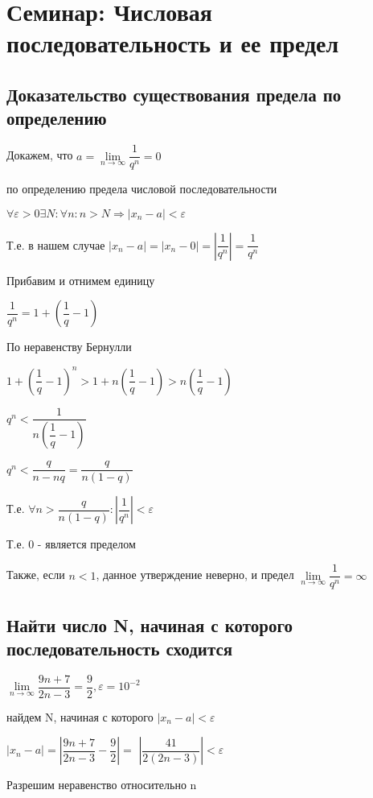 \section{Семинар: Числовая последовательность и ее предел}

\subsection{Доказательство существования предела по определению}

Докажем, что $ a = \lim\limits_{n \to \infty} \dfrac{1}{q^{n}} = 0$

по определению предела числовой последовательности

$\forall \varepsilon > 0 \exists N: \forall n: n > N \Rightarrow |x_{n} - a| < \varepsilon$

Т.е. в нашем случае $  |x_{n} - a| = |x_{n} - 0| = | \dfrac{1}{q^{n}} | = \dfrac{1}{q^{n}} $

Прибавим и отнимем единицу 

$ \dfrac{1}{q^{n}} = 1 + \left( \dfrac{1}{q} - 1 \right)  $

По неравенству Бернулли

$ 1 + ( \dfrac{1}{q} - 1 )^{n} > 1 + n ( \dfrac{1}{q} - 1 ) > n ( \dfrac{1}{q} - 1 ) $

$ q^{n} <  \dfrac{1}{n ( \dfrac{1}{q} - 1 )}  $

$ q^{n} <  \dfrac{q}{n - nq} = \dfrac{q}{n(1 - q)} $

Т.е. $ \forall n > \dfrac{q}{n(1 - q)} : | \dfrac{1}{q^{n}} | < \varepsilon $

Т.е. 0 - является пределом

Также, если $ n < 1 $, данное утверждение неверно, и предел 
$ \lim\limits_{n \to \infty} \dfrac{1}{q^{n}} = \infty $

\subsection{Найти число N, начиная с которого последовательность сходится}

$ \lim\limits_{n \to \infty} \dfrac{9n + 7}{2n - 3} = \dfrac{9}{2}, \varepsilon = 10^{-2}$

найдем N, начиная с которого $  |x_{n} - a| < \varepsilon $

$ |x_{n} - a| = \left|  \dfrac{9n + 7}{2n - 3} - \dfrac{9}{2} \right| = $
$ \left|  \dfrac{41}{2(2n - 3)} \right| < \varepsilon $

Разрешим неравенство относительно n

